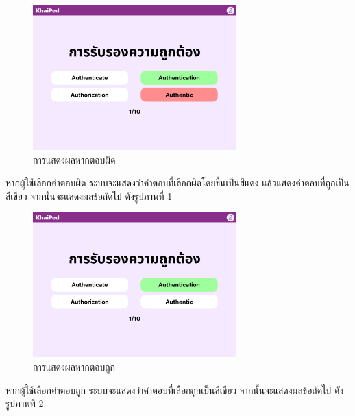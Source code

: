 \documentclass[12pt,oneside,openright,a4paper]{cpe-thai-project}
\begin{document}
\begin{figure}[!h]\centering
	\includegraphics[width=0.7\textwidth, keepaspectratio=true]{image/chap3/ui/quiz/Quiz - Wrong Answer.png}
	\caption{การแสดงผลหากตอบผิด}\label{fig:UI_QuizWrong}
\end{figure}
\hspace{1cm}
หากผู้ใช้เลือกคำตอบผิด ระบบจะแสดงว่าคำตอบที่เลือกผิดโดยขึ้นเป็นสีแดง แล้วแสดงคำตอบที่ถูกเป็นสีเขียว จากนั้นจะแสดงผลข้อถัดไป ดังรูปภาพที่ \ref{fig:UI_QuizWrong}

\pagebreak
\begin{figure}[!h]\centering
	\includegraphics[width=0.7\textwidth, keepaspectratio=true]{image/chap3/ui/quiz/Quiz - Correct Answer.png}
	\caption{การแสดงผลหากตอบถูก}\label{fig:UI_QuizCorrect}
\end{figure}
\hspace{1cm}
หากผู้ใช้เลือกคำตอบถูก ระบบจะแสดงว่าคำตอบที่เลือกถูกเป็นสีเขียว จากนั้นจะแสดงผลข้อถัดไป ดังรูปภาพที่ \ref{fig:UI_QuizCorrect}
\end{document}

